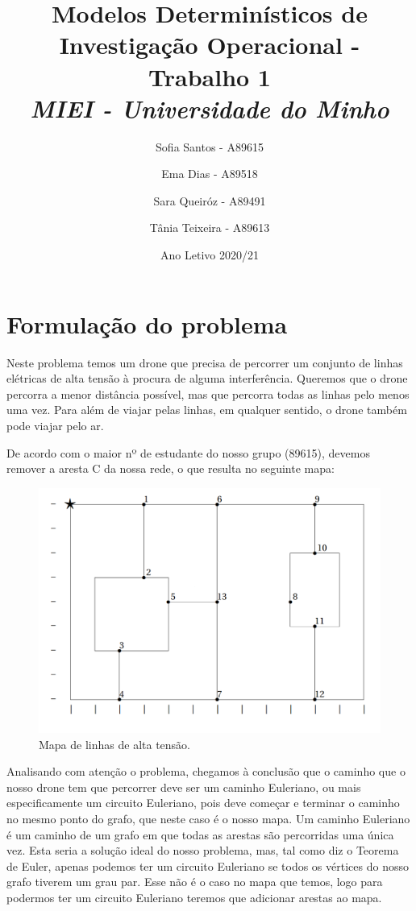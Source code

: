 \documentclass{article}
\begin{document}
\title{Modelos Determinísticos de Investigação Operacional - Trabalho 1\\
    \large\emph{MIEI - Universidade do Minho}}
\author{Sofia Santos - A89615 \and Ema Dias - A89518 \and
    Sara Queiróz - A89491 \and Tânia Teixeira - A89613}

\date{Ano Letivo 2020/21}    

\maketitle

\newpage

\section{Formulação do problema}

Neste problema temos um drone que precisa de percorrer um conjunto de linhas elétricas de alta tensão à procura de alguma interferência. Queremos que o drone percorra a menor distância possível, mas que percorra todas as linhas pelo menos uma vez. Para além de viajar pelas linhas, em qualquer sentido, o drone também pode viajar pelo ar.

De acordo com o maior nº de estudante do nosso grupo (89615), devemos remover a aresta C da nossa rede, o que resulta no seguinte mapa:

\begin{figure}[h]
    \centering
    \includegraphics[width=0.8\linewidth]{fig1.png}
    \caption{Mapa de linhas de alta tensão.}
    \label{mapa}
\end{figure}

Analisando com atenção o problema, chegamos à conclusão que o caminho que o nosso drone tem que percorrer deve ser um caminho Euleriano, ou mais especificamente um circuito Euleriano, pois deve começar e terminar o caminho no mesmo ponto do grafo, que neste caso é o nosso mapa. Um caminho Euleriano é um caminho de um grafo em que todas as arestas são percorridas uma única vez. Esta seria a solução ideal do nosso problema, mas, tal como diz o Teorema de Euler, apenas podemos ter um circuito Euleriano se todos os vértices do nosso grafo tiverem um grau par. Esse não é o caso no mapa que temos, logo para podermos ter um circuito Euleriano teremos que adicionar arestas ao mapa.
\end{document}
